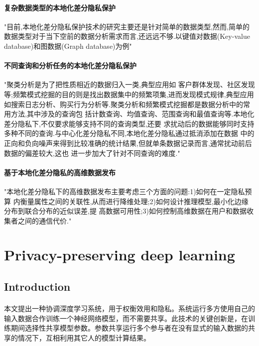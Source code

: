 \documentclass[12pt,a4paper]{article}
\begin{document}
\paragraph{复杂数据类型的本地化差分隐私保护} "目前,本地化差分隐私保护技术的研究主要还是针对简单的数据类型,然而,简单的数据类型对于当下空前的数据分析需求而言,还远远不够.以键值对数据(Key-value database)和图数据(Graph database)为例"
\paragraph{不同查询和分析任务的本地化差分隐私保护} "聚类分析是为了把性质相近的数据归入一类,典型应用如 客户群体发现、社区发现等;频繁模式挖掘的目的则是找出数据集中的频繁项集,进而发现模式规律,典型应用 如搜索日志分析、购买行为分析等.聚类分析和频繁模式挖掘都是数据分析中的常用方法,其中涉及的查询包 括计数查询、均值查询、范围查询和最值查询等.本地化差分隐私下,不仅要求能够支持不同的查询类型,还要 求扰动后的数据能够同时支持多种不同的查询.与中心化差分隐私不同,本地化差分隐私通过抵消添加在数据 中的正向和负向噪声来得到比较准确的统计结果,但就单条数据记录而言,通常扰动前后数据的偏差较大,这也 进一步加大了针对不同查询的难度."
\paragraph{基于本地化差分隐私的高维数据发布} "本地化差分隐私下的高维数据发布主要考虑三个方面的问题:1)如何在一定隐私预算 内衡量属性之间的关联性,从而进行降维处理;2)如何设计推理模型,最小化边缘分布到联合分布的近似误差,提 高数据可用性;3)如何控制高维数据在用户和数据收集者之间的通信代价."








\section{Privacy-preserving deep learning\cite{shokri2015ppdl}}
\subsection{Introduction}
\paragraph{} 本文提出一种协调深度学习系统，用于权衡效用和隐私。系统运行多方使用自己的输入数据合作训练一个神经网络模型，而不需要共享。此技术的关键创新是，在训练期间选择性共享模型参数。参数共享运行多个参与者在没有显式的输入数据的共享的情况下，互相利用其它人的模型计算结果。
\end{document}
